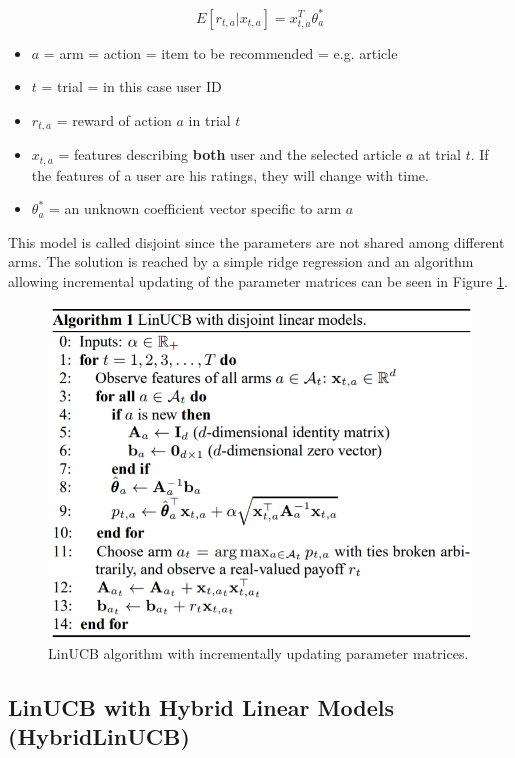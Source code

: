 \documentclass[12pt, titlepage]{article}
\begin{document}
$$
E[r_{t,a}|x_{t,a}] = x^T_{t,a}\theta^*_a
$$

\begin{itemize}
\item $a$ = arm = action = item to be recommended = e.g. article
\item $t$ = trial = in this case user ID
\item $r_{t,a}$ = reward of action $a$ in trial $t$ 
\item $x_{t,a}$ = features describing \textbf{both} user and the selected article $a$ at trial $t$. If the features of a user are his ratings, they will change with time.
\item $\theta^*_a$ = an unknown coefficient vector specific to arm $a$
\end{itemize}

This model is called disjoint since the parameters are not shared among different arms.
The solution is reached by a simple ridge regression and an algorithm allowing incremental updating of the parameter matrices can be seen in Figure \ref{fig:linUCB_alg}.

\begin{figure}[h]
 \centering
 \includegraphics[scale=0.9]{img/LinUCB_alg}
 \caption{LinUCB algorithm with incrementally updating parameter matrices.\cite{cit:paper}}
 \label{fig:linUCB_alg}
\end{figure}

\subsection{LinUCB with Hybrid Linear Models (HybridLinUCB)}
\end{document}

